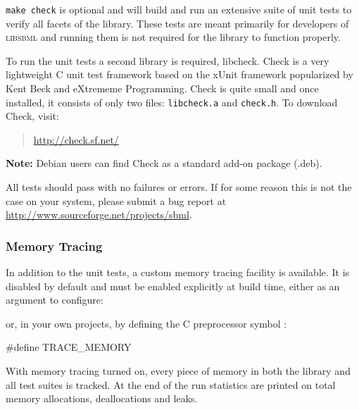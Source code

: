 \documentclass{cekmanual}
\begin{document}
\begin{example}[csh]
\end{example}


\texttt{make check} is optional and will build and run an extensive
suite of unit tests to verify all facets of the library.  These tests
are meant primarily for developers of \textsc{libsbml} and running
them is not required for the library to function properly.

To run the unit tests a second library is required, libcheck.  Check
is a very lightweight C unit test framework based on the xUnit
framework popularized by Kent Beck and eXtrememe Programming.  Check
is quite small and once installed, it consists of only two files:
\texttt{libcheck.a} and \texttt{check.h}.  To download Check, visit:

\begin{quote}
\url{http://check.sf.net/}
\end{quote}

\textbf{Note:} Debian users can find Check as a standard add-on
package (.deb).

All tests should pass with no failures or errors.  If for some reason
this is not the case on your system, please submit a bug report at
\url{http://www.sourceforge.net/projects/sbml}.


\subsubsection{Memory Tracing}

In addition to the unit tests, a custom memory tracing facility is
available.  It is disabled by default and must be enabled explicitly
at build time, either as an argument to configure:

\begin{example}[csh]
\end{example}

or, in your own projects, by defining the C preprocessor symbol
:

\begin{example}[c]
  #define TRACE_MEMORY
\end{example}

With memory tracing turned on, every piece of memory in both the
library and all test suites is tracked.  At the end of the run
statistics are printed on total memory allocations, deallocations and
leaks.
\end{document}
